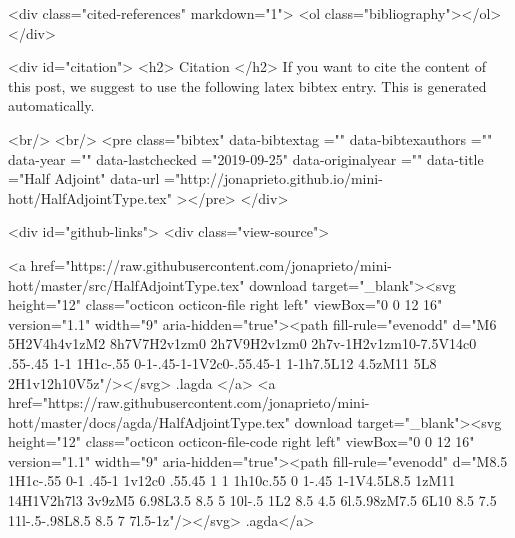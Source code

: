   <div class="cited-references" markdown="1">
  <ol class="bibliography"></ol>
  </div>


  
  <div id="citation">
  <h2> Citation </h2>
  If you want to cite the content of this post,
  we suggest to use the following latex bibtex entry.
  This is generated automatically.

  <br/>
  <br/>
  <pre class="bibtex"
       data-bibtextag =""
       data-bibtexauthors =""
       data-year =""
       data-lastchecked ="2019-09-25"
       data-originalyear =""
       data-title ="Half Adjoint"
       data-url ="http://jonaprieto.github.io/mini-hott/HalfAdjointType.tex"
  ></pre>
  </div>
  

  <div id="github-links">
    <div class="view-source">
      
        <a href="https://raw.githubusercontent.com/jonaprieto/mini-hott/master/src/HalfAdjointType.tex" download target="_blank"><svg height="12" class="octicon octicon-file right left" viewBox="0 0 12 16" version="1.1" width="9" aria-hidden="true"><path fill-rule="evenodd" d="M6 5H2V4h4v1zM2 8h7V7H2v1zm0 2h7V9H2v1zm0 2h7v-1H2v1zm10-7.5V14c0 .55-.45 1-1 1H1c-.55 0-1-.45-1-1V2c0-.55.45-1 1-1h7.5L12 4.5zM11 5L8 2H1v12h10V5z"/></svg> .lagda </a>
        <a href="https://raw.githubusercontent.com/jonaprieto/mini-hott/master/docs/agda/HalfAdjointType.tex" download target="_blank"><svg height="12" class="octicon octicon-file-code right left" viewBox="0 0 12 16" version="1.1" width="9" aria-hidden="true"><path fill-rule="evenodd" d="M8.5 1H1c-.55 0-1 .45-1 1v12c0 .55.45 1 1 1h10c.55 0 1-.45 1-1V4.5L8.5 1zM11 14H1V2h7l3 3v9zM5 6.98L3.5 8.5 5 10l-.5 1L2 8.5 4.5 6l.5.98zM7.5 6L10 8.5 7.5 11l-.5-.98L8.5 8.5 7 7l.5-1z"/></svg> .agda</a>
      
